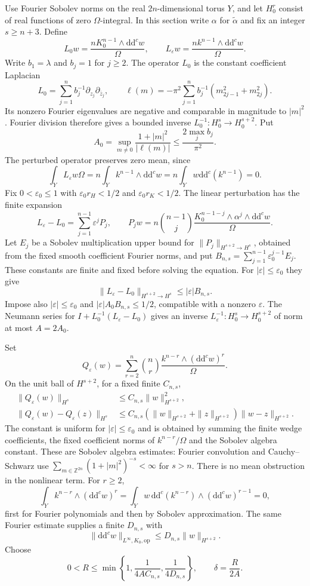 \documentclass[11pt]{article}
\newcommand{\ddc}{\mathrm{d}\mathrm{d}^c}
\newcommand{\eps}{\varepsilon}
\newcommand{\Om}{\Omega}
\begin{document}
Use Fourier Sobolev norms on the real $2n$-dimensional torus $Y$, and let
$H^r_0$ consist of real functions of zero $\Om$-integral. In this section
write $\alpha$ for $\widetilde\alpha$ and fix an integer $s\ge n+3$.
Define
\[
 L_0w=\frac{nK_0^{n-1}\wedge\ddc w}{\Om},\qquad
 L_\eps w=\frac{nk^{n-1}\wedge\ddc w}{\Om}.
\]
Write $b_1=\lambda$ and $b_j=1$ for $j\ge2$. The operator $L_0$ is the
constant coefficient Laplacian
\[
 L_0=\sum_{j=1}^n b_j^{-1}\partial_{z_j}\partial_{\bar z_j},
 \qquad \ell(m)=-\pi^2\sum_{j=1}^n b_j^{-1}
                       (m_{2j-1}^2+m_{2j}^2).
\]
Its nonzero Fourier eigenvalues are negative and comparable in magnitude to $|m|^2$.
Fourier division therefore gives a bounded inverse
$L_0^{-1}:H^s_0\to H^{s+2}_0$. Put
\[
 A_0=\sup_{m\ne0}\frac{1+|m|^2}{|\ell(m)|}
                  \le\frac{2\max_j b_j}{\pi^2}.
\]
The perturbed operator preserves zero mean, since
\[
 \int_Y L_\eps w\Om=n\int_Yk^{n-1}\wedge\ddc w
                         =n\int_Yw\ddc(k^{n-1})=0.
\]
Fix $0<\eps_0\le1$ with $\eps_0r_H<1/2$ and $\eps_0r_K<1/2$.
The linear perturbation has the finite expansion
\[
 L_\eps-L_0=\sum_{j=1}^{n-1}\eps^jP_j,\qquad
 P_jw=n\binom{n-1}{j}
       \frac{K_0^{n-1-j}\wedge\alpha^j\wedge\ddc w}{\Om}.
\]
Let $E_j$ be a Sobolev multiplication upper bound for
$\|P_j\|_{H^{s+2}\to H^s}$, obtained from the fixed smooth coefficient
Fourier norms, and put
$B_{n,s}=\sum_{j=1}^{n-1}\eps_0^{j-1}E_j$.
These constants are finite and fixed before solving the equation. For
$|\eps|\le\eps_0$ they give
\[
 \|L_\eps-L_0\|_{H^{s+2}\to H^s}\le|\eps|B_{n,s}.
\]
Impose also $|\eps|\le\eps_0$ and $|\eps|A_0B_{n,s}\le1/2$,
compatible with a nonzero $\eps$.
The Neumann series for $I+L_0^{-1}(L_\eps-L_0)$ gives an inverse
$L_\eps^{-1}:H^s_0\to H^{s+2}_0$ of norm at most
$A=2A_0$.

Set
\[
 Q_\eps(w)=\sum_{r=2}^n\binom nr
                   \frac{k^{n-r}\wedge(\ddc w)^r}{\Om}.
\]
On the unit ball of $H^{s+2}$, for a fixed finite $C_{n,s}$,
\begin{align}
 \|Q_\eps(w)\|_{H^s}&\le C_{n,s}\|w\|_{H^{s+2}}^2,\label{eq:quadratic}\\
 \|Q_\eps(w)-Q_\eps(z)\|_{H^s}&\le C_{n,s}
  (\|w\|_{H^{s+2}}+\|z\|_{H^{s+2}})\|w-z\|_{H^{s+2}}.
 \nonumber
\end{align}
The constant is uniform for $|\eps|\le\eps_0$ and is obtained by summing
the finite wedge coefficients, the fixed coefficient norms of
$k^{n-r}/\Om$ and the Sobolev algebra constant.
These are Sobolev algebra estimates: Fourier convolution and
Cauchy--Schwarz use
$\sum_{m\in\mathbb Z^{2n}}(1+|m|^2)^{-s}<\infty$ for $s>n$.
There is no mean obstruction in the nonlinear term. For $r\ge2$,
\[
 \int_Y k^{n-r}\wedge(\ddc w)^r
 =\int_Yw\,\ddc(k^{n-r})\wedge(\ddc w)^{r-1}=0,
\]
first for Fourier polynomials and then by Sobolev approximation.
The same Fourier estimate supplies a finite $D_{n,s}$ with
\[
 \|\ddc w\|_{L^\infty,K_0,\mathrm{op}}
                         \le D_{n,s}\|w\|_{H^{s+2}}.
\]
Choose
\begin{equation}\label{eq:radius}
 0<R\le\min\left\{1,\frac1{4AC_{n,s}},\frac1{4D_{n,s}}\right\},
 \qquad \delta=\frac{R}{2A}.
\end{equation}
\end{document}
